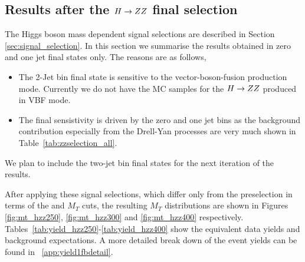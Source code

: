 \subsection{Results after the $H\to ZZ$ final selection}
The Higgs boson mass dependent signal selections are described in Section \ref{sec:signal_selection}. 
In this section we summarise the results obtained in zero and one jet final states only. 
The reasons are as follows,
\begin{itemize}
\item The 2-Jet bin final state is sensitive to the vector-boson-fusion production mode. 
Currently we do not have the MC samples for the $H\to ZZ$ produced in VBF mode.
\item The final sensistivity is driven by the zero and one jet bins as the background contribution especially from the 
Drell-Yan processes are very much shown in Table~\ref{tab:zzselection_all}.
\end{itemize}
We plan to include the two-jet bin final states for the next iteration of the results. 

After applying these signal selections, which differ only from the \zz preselection
in terms of the \met and $M_T$ cuts, the resulting $M_T$ distributions are shown
in Figures \ref{fig:mt_hzz250}, \ref{fig:mt_hzz300} and \ref{fig:mt_hzz400} respectively.
Tables~\ref{tab:yield_hzz250}-\ref{tab:yield_hzz400} show the equivalent data yields
and background expectations.
A more detailed break down of the event yields can be found in ~\ref{app:yield1fbdetail}.




